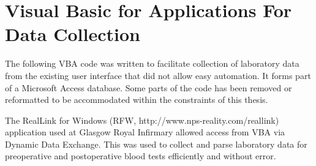 \chapter{Visual Basic for Applications For Data Collection}
\label{AppendixAccessDatabase}
\clearpage


The following VBA code was written to facilitate collection of laboratory data from the existing user interface that did not allow easy automation. It forms part of a Microsoft Access database. Some parts of the code has been removed or reformatted to be accommodated within the constraints of this thesis.

The RealLink for Windows (RFW, http://www.nps-reality.com/reallink) application used at Glasgow Royal Infirmary allowed access from VBA via Dynamic Data Exchange. This was used to collect and parse laboratory data for preoperative and postoperative blood tests efficiently and without error.

